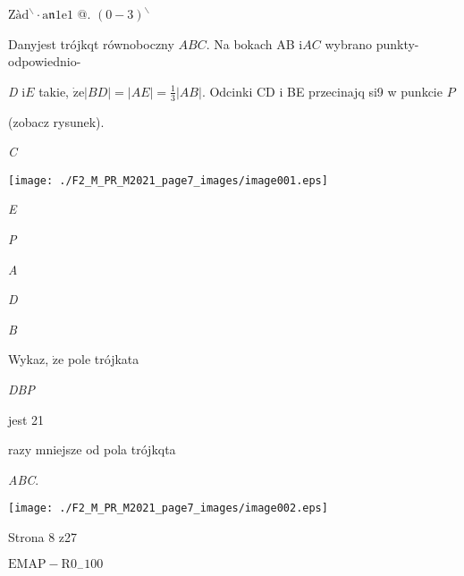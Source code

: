 \documentclass[a4paper,12pt]{article}
\begin{document}
$\mathrm{Z}\text{à} \mathrm{d}^{\backslash }\cdot \mathrm{a}\mathfrak{n}1\mathrm{e}1$ @. $(0-3)^{\backslash }$

Danyjest trójkqt równoboczny $ABC$. Na bokach AB $\mathrm{i} AC$ wybrano punkty- odpowiednio-

{\it D} $\mathrm{i} E$ takie, $\dot{\mathrm{z}}\mathrm{e} |BD| = |AE| =\displaystyle \frac{1}{3}|AB|$. Odcinki CD $\mathrm{i}$ BE przecinajq si9 w punkcie $P$

(zobacz rysunek).

{\it C}
\begin{center}
\texttt{[image: ./F2\_M\_PR\_M2021\_page7\_images/image001.eps]}
\end{center}
{\it E}

{\it P}

{\it A}

{\it D}

{\it B}

Wykaz, $\dot{\mathrm{z}}\mathrm{e}$ pole trójkata

{\it DBP}

jest 21

razy mniejsze od pola trójkqta

{\it ABC}.
\begin{center}
\texttt{[image: ./F2\_M\_PR\_M2021\_page7\_images/image002.eps]}
\end{center}
Strona 8 z27

$\mathrm{E}\mathrm{M}\mathrm{A}\mathrm{P}-\mathrm{R}0_{-}100$
\end{document}
